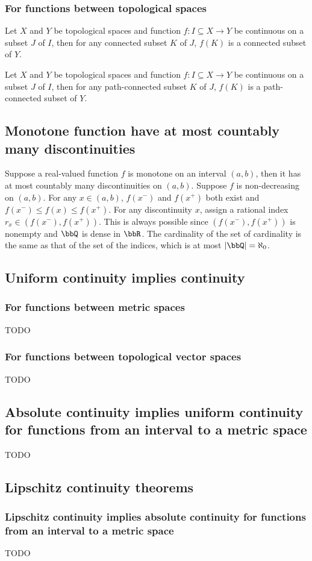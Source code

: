 \subsubsection{For functions between topological spaces}
Let $X$ and $Y$ be topological spaces and function $f\colon I\subseteq X\to Y$ be continuous on a subset $J$ of $I$, then for any connected subset $K$ of $J$, $f(K)$ is a connected subset of $Y$.

Let $X$ and $Y$ be topological spaces and function $f\colon I\subseteq X\to Y$ be continuous on a subset $J$ of $I$, then for any path-connected subset $K$ of $J$, $f(K)$ is a path-connected subset of $Y$.
\subsection{Monotone function have at most countably many discontinuities}
Suppose a real-valued function $f$ is monotone on an interval $(a,b)$, then it has at most countably many discontinuities on $(a,b)$.
\bpr
Suppose $f$ is non-decreasing on $(a,b)$. For any $x\in(a,b)$, $f(x^-)$ and $f(x^+)$ both exist and $f(x^-)\leq f(x)\leq f(x^+)$. For any discontinuity $x$, assign a rational index $r_x\in(f(x^-),f(x^+))$. This is always possible since $(f(x^-),f(x^+))$ is nonempty and $\bbQ$ is dense in $\bbR$. The cardinality of the set of cardinality is the same as that of the set of the indices, which is at most $|\bbQ|=\aleph_0$.
\epr
\subsection{Uniform continuity implies continuity}
\subsubsection{For functions between metric spaces}
TODO
\subsubsection{For functions between topological vector spaces}
TODO
\subsection{Absolute continuity implies uniform continuity for functions from an interval to a metric space}
TODO
\subsection{Lipschitz continuity theorems}
\subsubsection{Lipschitz continuity implies absolute continuity for functions from an interval to a metric space}
TODO
